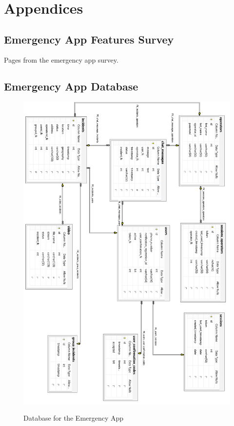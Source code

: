 \documentclass{article}
\begin{document}
\pagebreak
    \section{Appendices}
    \subsection{Emergency App Features Survey} Pages from the emergency app survey.


\begin{figure}[htp] \centering{
}
\end{figure}
\pagebreak

     
	
	\subsection{Emergency App Database}
	
	\begin{figure}[H]
		\centering
		\includegraphics[width=.9\textwidth]{"VideoStream/database"}
		
		Database for the Emergency App
	\end{figure} \clearpage
	
\end{document}
